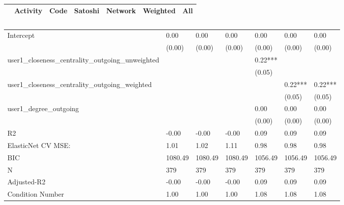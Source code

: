 \begin{table}
\caption{}
\begin{center}
\begin{tabular}{lcccccc}
\hline
                                               & Activity &   Code  & Satoshi & Network & Weighted &   All    \\
\hline
\hline
\end{tabular}
\begin{tabular}{lllllll}
Intercept                                      & 0.00     & 0.00    & 0.00    & 0.00    & 0.00     & 0.00     \\
                                               & (0.00)   & (0.00)  & (0.00)  & (0.00)  & (0.00)   & (0.00)   \\
user1_closeness_centrality_outgoing_unweighted &          &         &         & 0.22*** &          &          \\
                                               &          &         &         & (0.05)  &          &          \\
user1_closeness_centrality_outgoing_weighted   &          &         &         &         & 0.22***  & 0.22***  \\
                                               &          &         &         &         & (0.05)   & (0.05)   \\
user1_degree_outgoing                          &          &         &         & 0.00    & 0.00     & 0.00     \\
                                               &          &         &         & (0.00)  & (0.00)   & (0.00)   \\
R2                                             & -0.00    & -0.00   & -0.00   & 0.09    & 0.09     & 0.09     \\
ElasticNet CV MSE:                             & 1.01     & 1.02    & 1.11    & 0.98    & 0.98     & 0.98     \\
BIC                                            & 1080.49  & 1080.49 & 1080.49 & 1056.49 & 1056.49  & 1056.49  \\
N                                              & 379      & 379     & 379     & 379     & 379      & 379      \\
Adjusted-R2                                    & -0.00    & -0.00   & -0.00   & 0.09    & 0.09     & 0.09     \\
Condition Number                               & 1.00     & 1.00    & 1.00    & 1.08    & 1.08     & 1.08     \\
\hline
\end{tabular}
\end{center}
\end{table}